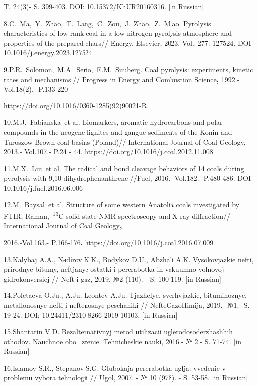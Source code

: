 T. 24(3)- S. 399-403. DOI: 10.15372/KhUR20160316. {[}in Russian{]}

8.C.~Ma,~Y.~Zhao,~T.~Lang,~C.~Zou,~J.~Zhao,~Z.~Miao. Pyrolysis
characteristics of low-rank coal in a low-nitrogen pyrolysis atmosphere
and properties of the prepared chars// Energy, Elsevier, 2023.-Vol.~277:
127524. DOI 10.1016/j.energy.2023.127524

9.P.R.~Solomon,~M.A.~Serio,~E.M.~Suuberg. Coal pyrolysis: experiments,
kinetic rates and mechanisms.// Progress in Energy and Combustion
Science\textbf{,} 1992.-Vol.18(2).- P.133-220

https://doi.org/10.1016/0360-1285(92)90021-R

10.M.J.~Fabianska\emph{~}et al\emph{.} Biomarkers, aromatic hydrocarbons
and polar compounds in the neogene lignites and gangue sediments of the
Konin and Turoszow Brown coal basins (Poland)// International Journal of
Coal Geology, 2013.- Vol.107.- P.24 - 44.
https://doi.org/10.1016/j.coal.2012.11.008

11.M.X.~Liu\emph{~}et al. The radical and bond cleavage behaviors of 14
coals during pyrolysis with 9,10-dihydrophenanthrene //Fuel, 2016.-
Vol.182.- P.480-486. DOI 10.1016/j.fuel.2016.06.006

12.M.~Baysal\emph{~}et al. Structure of some western Anatolia coals
investigated by FTIR, Raman,~\textsuperscript{13}C solid state NMR
spectroscopy and X-ray diffraction// International Journal of Coal
Geology\textbf{,}

2016.-Vol.163.- P.166-176\textbf{.}
https://doi.org/10.1016/j.coal.2016.07.009

13.Kalybaj A.A., Nәdіrov N.K., Bodykov D.U., Abzhali A.K. Vysokovjazkie
nefti, prirodnye bitumy, neftjanye ostatki i pererabotka ih
vakuumno-volnovoj gidrokonversiej // Neft\textquotesingle{} i gaz,
2019.-№2 (110). - S. 100-119. {[}in Russian{]}

14.Poletaeva O.Ju., A.Ju. Leont\textquotesingle ev A.Ju. Tjazhelye,
sverhvjazkie, bituminoznye, metallonosnye nefti i neftenosnye peschaniki
// NefteGazoHimija, 2019.- №1.- S. 19-24. DOI:
10.24411/2310-8266-2019-10103. {[}in Russian{]}

15.Shantarin V.D. Bezal\textquotesingle ternativnyj metod utilizacii
uglerodosoderzhashhih othodov. Nauchnoe obo¬zrenie. Tehnicheskie nauki,
2016.- № 2.- S. 71-74. {[}in Russian{]}

16.Islamov S.R., Stepanov S.G. Glubokaja pererabotka uglja: vvedenie v
problemu vybora tehnologii // Ugol\textquotesingle, 2007. - № 10 (978).
- S. 53-58. {[}in Russian{]}

